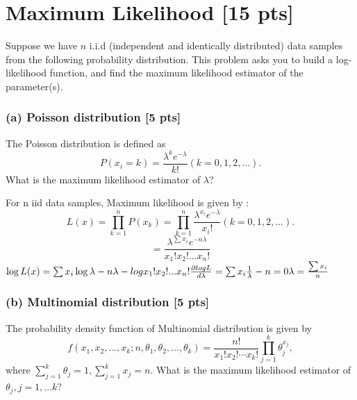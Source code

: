 \documentclass[twoside,10pt]{article}
\begin{document}
\section{Maximum Likelihood [15 pts]}

Suppose we have $n$ i.i.d (independent and identically distributed)
data samples from the following probability distribution. This
problem asks you to build a log-likelihood function, and find the
maximum likelihood estimator of the parameter(s).

\subsubsection*{(a) Poisson distribution [5 pts]}
The Poisson distribution is defined as
\begin{equation} \nonumber
P(x_i = k) = \frac{\lambda^k e^{-\lambda}}{k!} (k = 0, 1, 2, ...).
\end{equation}
What is the maximum likelihood estimator of $\lambda$?
  
For n iid data samples, Maximum likelihood is given by :
\begin{equation} \nonumber
L(x) = \prod_{k=1}^{n} P(x_k)  =  \prod_{k=1}^{n} \frac{\lambda^{x_i} e^{-\lambda}}{x_i!} (k = 0, 1, 2, ...).
\end{equation}
\begin{equation} \nonumber
= \frac{\lambda^{\sum x_i}e^{-n \lambda}}{x_1! x_2! ... x_n!}
\end{equation}
$
\log L(x)  =   {\sum x_i} \log \lambda - n\lambda -log {x_1! x_2! ... x_n!} \\[.55cm]
\frac{\partial log L}{d\lambda}  = {\sum x_i}\frac{1}{\lambda} -n = 0 \\ [.55cm]
\lambda = \frac {\sum x_i} {n} \\[.55cm]
$
\subsubsection*{(b) Multinomial distribution [5 pts]}
The probability density function of Multinomial distribution is given by 
$$f(x_1,x_2,\dots,x_k;n,\theta_1,\theta_2,\dots,\theta_k)=\frac{n!}{x_1!x_2!\cdots x_k!}\prod_{j=1}^{k}\theta_j^{x_j},$$
where $\sum_{j=1}^k\theta_j=1,\sum_{j=1}^k x_j=n$. What is the maximum likelihood estimator of $\theta_j, j=1,\dots k$?
\end{document}
